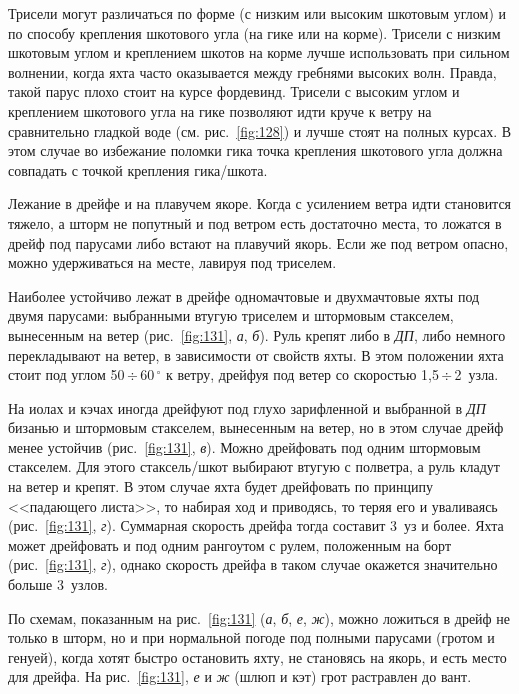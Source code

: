 \documentclass[a4paper, 12pt, twoside, final, book, russian, fittopage, cyremdash]{ncc}
\newcommand{\gr}{\ensuremath{\,^\circ}\xspace}
\newcommand{\otdo}{\,\ensuremath{\div}\,}
\newcommand{\ris}[1]{\ref{fig:#1}}
\begin{document}
Трисели могут различаться по форме (с низким или высоким шкотовым углом) и по способу крепления шкотового угла (на гике или на корме). Трисели с низким шкотовым углом и креплением шкотов на корме лучше использовать при сильном волнении, когда яхта часто оказывается между гребнями высоких волн. Правда, такой парус плохо стоит на курсе фордевинд. Трисели с высоким углом и креплением шкотового угла на гике позволяют идти круче к ветру на сравнительно гладкой воде (см. рис.~\ris{128}) и лучше стоят на полных курсах. В этом случае во избежание поломки гика точка крепления шкотового угла должна совпадать с точкой крепления гика\-/шкота.

Лежание в дрейфе и на плавучем якоре. Когда с усилением ветра идти становится тяжело, а шторм не попутный и под ветром есть достаточно места, то ложатся в дрейф под парусами либо встают на плавучий якорь. Если же под ветром опасно, можно удерживаться на месте, лавируя под триселем.

Наиболее устойчиво лежат в дрейфе одномачтовые и двухмачтовые яхты под двумя парусами: выбранными втугую триселем и штормовым стакселем, вынесенным на ветер (рис.~\ris{131}, \textit{а}, \textit{б}). Руль крепят либо в \textit{ДП}, либо немного перекладывают на ветер, в зависимости от свойств яхты. В этом положении яхта стоит под углом 50\otdo 60\gr к ветру, дрейфуя под ветер со скоростью 1,5\otdo 2~узла. 

На иолах и кэчах иногда дрейфуют под глухо зарифленной и выбранной в \textit{ДП} бизанью и штормовым стакселем, вынесенным на ветер, но в этом случае дрейф менее устойчив (рис.~\ris{131}, \textit{в}). Можно дрейфовать под одним штормовым стакселем. Для этого стаксель\-/шкот выбирают втугую с полветра, а руль кладут на ветер и крепят. В этом случае яхта будет дрейфовать по принципу <<падающего листа>>, то набирая ход и приводясь, то теряя его и уваливаясь (рис.~\ris{131}, \textit{г}). Суммарная скорость дрейфа тогда составит 3~уз и более. Яхта может дрейфовать и под одним рангоутом с рулем, положенным на борт (рис.~\ris{131}, \textit{г}), однако скорость дрейфа в таком случае окажется значительно больше 3~узлов.

По схемам, показанным на рис.~\ris{131} (\textit{а}, \textit{б}, \textit{е}, \textit{ж}), можно ложиться в дрейф не только в шторм, но и при нормальной погоде под полными парусами (гротом и генуей), когда хотят быстро остановить яхту, не становясь на якорь, и есть место для дрейфа. На рис.~\ris{131}, \textit{е} и \textit{ж} (шлюп и кэт) грот растравлен до вант.
\end{document}
